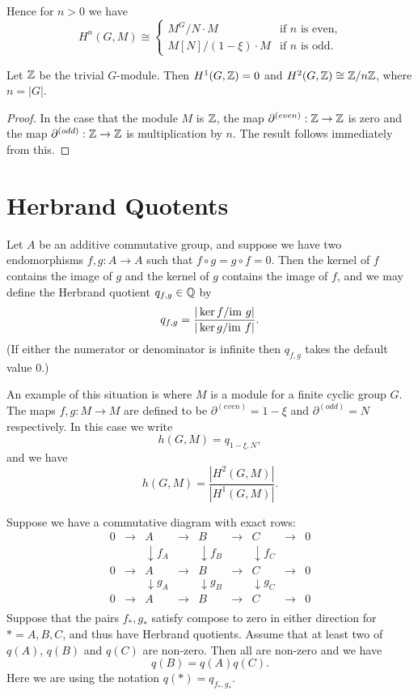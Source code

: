 Hence for $n > 0$ we have
\[
  H^n(G,M) \cong \begin{cases}
    M^G / N\cdot M & \text{if $n$ is even,}\\
    M[N] / (1-\xi) \cdot M & \text{if $n$ is odd.}
  \end{cases}
\]

\begin{theorem}\label{cyclic group cohomology with values in Z}
  Let ${\mathbb Z}$ be the trivial $G$-module.
  Then $H^1(G,{\mathbb Z})=0$ and $H^2(G,{\mathbb Z}) \cong {\mathbb Z}/n{\mathbb Z}$, where $n = |G|$.
\end{theorem}

\begin{proof}
  In the case that the module $M$ is ${\mathbb Z}$, the map $\partial^{(even)} : {\mathbb Z} \to {\mathbb Z}$ is zero
  and the map $\partial^{(odd)} : {\mathbb Z}\to {\mathbb Z}$ is multiplication by $n$.
  The result follows immediately from this.
\end{proof}


\section{Herbrand Quotents}

Let $A$ be an additive commutative group, and suppose we have two endomorphisms
$f,g : A \to A$ such that $f \circ g = g \circ f = 0$.
Then the kernel of $f$ contains the image of $g$ and the kernel of $g$ contains the image of $f$,
and we may define the Herbrand quotient $q_{f,g} \in {\mathbb Q}$ by
\[
  q_{f,g} = \frac{| \ker f / \mathrm{im}\  g|}{| \ker g / \mathrm{im}\  f|}.
\]
(If either the numerator or denominator is infinite then $q_{f,g}$ takes the default value $0$.)

An example of this situation is where $M$ is a module for a finite cyclic group $G$.
The maps $f,g : M \to M$ are defined to be $\partial^{(even)} = 1-\xi$ and $\partial^{(odd)} = N$
respectively.
In this case we write
\[
  h(G,M) = q_{1-\xi,N},
\]
and we have
\[
  h(G,M) = \frac{|H^2(G,M)|}{|H^1(G,M)|}.
\]

\begin{theorem}
  \label{Herbrand of short exact sequence}
  Suppose we have a commutative diagram with exact rows:
  \[
    \begin{matrix}
      0 &\to& A &\to& B &\to& C &\to& 0 \\
      &&\downarrow f_A &&\downarrow f_B &&\downarrow f_C \\
      0 &\to& A &\to& B &\to& C &\to& 0 \\
      &&\downarrow g_A &&\downarrow g_B &&\downarrow g_C \\
      0 &\to& A &\to& B &\to& C &\to& 0 \\
    \end{matrix}
  \]
  Suppose that the pairs $f_*,g_*$ satisfy compose to zero in either direction
  for $*=A,B,C$, and thus have Herbrand quotients.
  Assume that at least two of $q(A)$, $q(B)$ and $q(C)$ are non-zero.
  Then all are non-zero and we have
  \[
    q(B) = q(A) q(C).
  \]
  Here we are using the notation $q(*) = q_{f_*,g_*}$.
\end{theorem}



